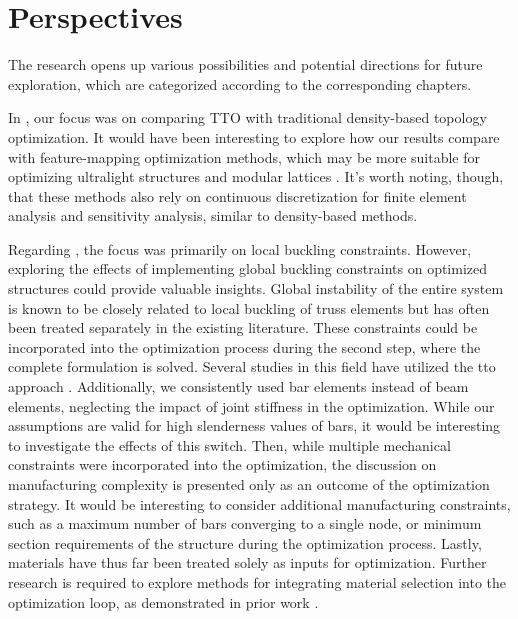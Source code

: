 \section*{Perspectives}
The research opens up various possibilities and potential directions for future exploration, which are categorized according to the corresponding chapters.

In , our focus was on comparing TTO with traditional density-based topology optimization. It would have been interesting to explore how our results compare with feature-mapping optimization methods, which may be more suitable for optimizing ultralight structures and modular lattices . It's worth noting, though, that these methods also rely on continuous discretization for finite element analysis and sensitivity analysis, similar to density-based methods.

Regarding , the focus was primarily on local buckling constraints. However, exploring the effects of implementing global buckling constraints on optimized structures could provide valuable insights. Global instability of the entire system is known to be closely related to local buckling of truss elements  but has often been treated separately in the existing literature. These constraints could be incorporated into the optimization process during the second step, where the complete formulation is solved. Several studies in this field have utilized the \gls{tto} approach . Additionally, we consistently used bar elements instead of beam elements, neglecting the impact of joint stiffness in the optimization. While our assumptions are valid for high slenderness values of bars, it would be interesting to investigate the effects of this switch. Then, while multiple mechanical constraints were incorporated into the optimization, the discussion on manufacturing complexity is presented only as an outcome of the optimization strategy. It would be interesting to consider additional manufacturing constraints, such as a maximum number of bars converging to a single node, or minimum section requirements of the structure during the optimization process. Lastly, materials have thus far been treated solely as inputs for optimization. Further research is required to explore methods for integrating material selection into the optimization loop, as demonstrated in prior work .


